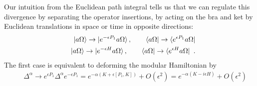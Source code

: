 \documentclass[a4paper,11pt]{article}
\theoremstyle{definition}
\newcommand{\mA}{\mathcal{A}}
\newcommand{\nn}{\nonumber}
\newcommand{\ep}{\epsilon}
\newcommand{\tr}{\text{tr}}
\begin{document}
Our intuition from the Euclidean path integral tells us that we can regulate this divergence by separating the operator insertions, by acting on the bra and ket by Euclidean translations in space or time in opposite directions:
\begin{eqnarray}
&&\ket{a\Omega}\to \ket{e^{-\ep P_1}a\Omega},\qquad \bra{a\Omega}\to \bra{e^{\ep P_1} a\Omega}\nn\\
&&\ket{a\Omega}\to \ket{e^{-\ep H}a\Omega},\qquad \bra{a\Omega}\to \bra{e^{\ep H} a\Omega}\ .
\end{eqnarray}
The first case is equivalent to deforming the modular Hamiltonian by
\begin{eqnarray}
        &&\Delta^\alpha\to e^{\ep P_1}\Delta^\alpha e^{-\ep P_1}=e^{-\alpha (K+\ep[P_1,K])}+O(\ep^2)=e^{-\alpha(K-i\ep H)}+O(\ep^2)
\end{eqnarray}
\end{document}
